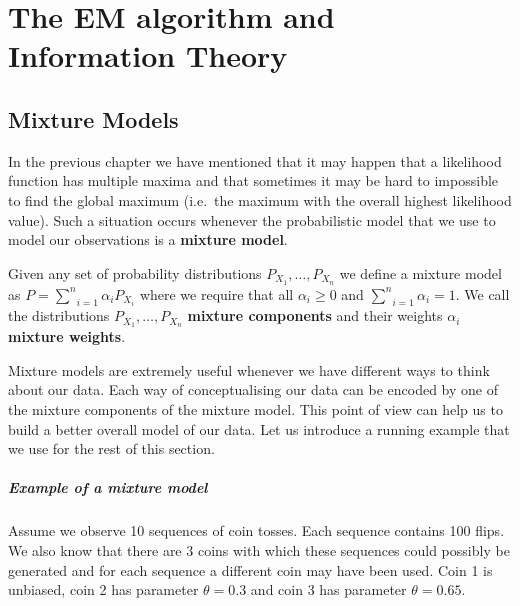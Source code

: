 \chapter{The EM algorithm and Information Theory}

\section{Mixture Models}\label{sec:mixtureModels}

In the previous chapter we have mentioned that it may happen that a likelihood function has multiple 
maxima and that sometimes it may be hard to impossible to find the global maximum (i.e.\ the maximum
with the overall highest likelihood value). Such a situation occurs whenever the probabilistic model
that we use to model our observations is a \textbf{mixture model}.

\begin{Definition}\label{def:mixtureModel}
Given any set of probability distributions $ P_{X_1}, \ldots, P_{X_n} $  we define a mixture model as
$ P = \underset{i=1}{\overset{n}{\sum}} \alpha_{i}P_{X_i} $
where we require that all $ \alpha_{i} \geq 0$ and 
$ \underset{i=1}{\overset{n}{\sum}} \alpha_{i} = 1 $.
We call the distributions $ P_{X_1}, \ldots, P_{X_n} $ \textbf{mixture components} and their weights
$ \alpha_{i} $ \textbf{mixture weights}.
\end{Definition}

Mixture models are extremely useful whenever we have different ways to think about our data. Each way
of conceptualising our data can be encoded by one of the mixture components of the mixture model.
This point of view can help us to build a better overall model of our data. Let us introduce a running example that
we use for the rest of this section. 

\paragraph{Example of a mixture model} Assume we observe 10 sequences of coin tosses. Each sequence
contains 100 flips. We also know that there are 3 coins with which these sequences could possibly be
generated and for each sequence a different coin may have been used. Coin 1 is unbiased, coin 2 has
parameter $ \theta = 0.3 $ and coin 3 has parameter $ \theta = 0.65 $. 
 
